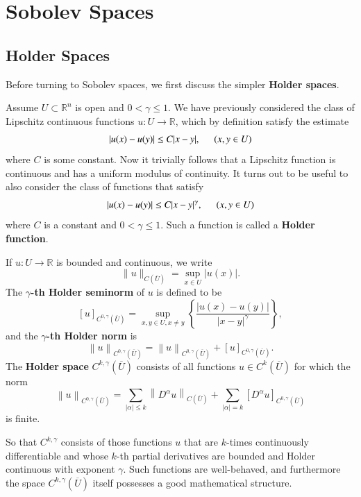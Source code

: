 \section{Sobolev Spaces}
\subsection{Holder Spaces}\label{sec4.1}
Before turning to Sobolev spaces, we first discuss the simpler \textbf{Holder spaces}.\par
Assume $U\subset\mathbb{R}^n$ is open and $0<\gamma\le 1$. We have previously considered the class of Lipschitz continuous functions $u:U\to\mathbb{R}$, which by definition satisfy the estimate 
$$|u(x)-u(y)|\le C|x-y|,\hspace{0.5cm}(x,y\in U)$$
where $C$ is some constant. Now it trivially follows that a Lipschitz function is continuous and has a uniform modulus of continuity. It turns out to be useful to also consider the class of functions that satisfy 
$$|u(x)-u(y)|\le C|x-y|^\gamma,\hspace{0.5cm}(x,y\in U)$$
where $C$ is a constant and $0<\gamma\le 1$. Such a function is called a \textbf{Holder function}.
\begin{definition}
If $u:U\to\mathbb{R}$ is bounded and continuous, we write 
$$\|u\|_{C(\overline{U})}=\sup_{x\in U}|u(x)|.$$
The \textbf{$\gamma$-th Holder seminorm} of $u$ is defined to be 
$$
\left[ u \right] _{C^{0,\gamma}(\overline{U})}=\mathop {\mathrm{sup}} \limits_{x,y\in U,x\ne y}\left\{ \frac{\left| u\left( x \right) -u\left( y \right) \right|}{\left| x-y \right|^{\gamma}} \right\} ,
$$
and the \textbf{$\gamma$-th Holder norm} is 
$$
\left\| u \right\| _{C^{0,\gamma}(\overline{U})}=\left\| u \right\| _{C^{0,\gamma}(\overline{U})}+\left[ u \right] _{C^{0,\gamma}(\overline{U})}.
$$
The \textbf{Holder space} $C^{k,\gamma}(\overline{U})$ consists of all functions $u\in C^k(\overline{U})$ for which the norm 
$$
\left\| u \right\| _{C^{0,\gamma}(\overline{U})}=\sum_{\left| \alpha \right|\le k}{\left\| D^{\alpha}u \right\| _{C(\overline{U})}}+\sum_{\left| \alpha \right|=k}{\left[ D^{\alpha}u \right] _{C^{0,\gamma}(\overline{U})}}
$$
is finite.
\end{definition}
So that $C^{k,\gamma}$ consists of those functions $u$ that are $k$-times continuously differentiable and whose $k$-th partial derivatives are bounded and Holder continuous with exponent $\gamma$. Such functions are well-behaved, and furthermore the space $C^{k,\gamma}(\overline{U})$ itself possesses a good mathematical structure.
